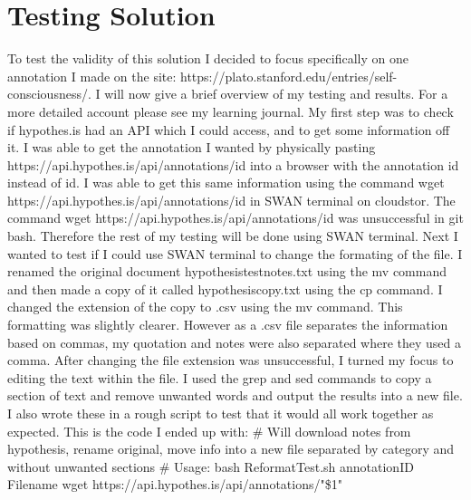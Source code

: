 \documentclass{article}
\begin{document}
\section{Testing Solution}
To test the validity of this solution I decided to focus specifically on one annotation I made on the site: https://plato.stanford.edu/entries/self-consciousness/. I will now give a brief overview of my testing and results. For a more detailed account please see my learning journal. 
\newline
\newline
My first step was to check if hypothes.is had an API which I could access, and to get some information off it. I was able to get the annotation I wanted by physically pasting https://api.hypothes.is/api/annotations/{id} into a browser with the annotation id instead of {id}. I was able to get this same information using the command wget https://api.hypothes.is/api/annotations/{id} in SWAN terminal on cloudstor. The command wget https://api.hypothes.is/api/annotations/{id} was unsuccessful in git bash. Therefore the rest of my testing will be done using SWAN terminal. 
\newline
\newline
Next I wanted to test if I could use SWAN terminal to change the formating of the file. I renamed the original document hypothesistestnotes.txt using the mv command and then made a copy of it called hypothesiscopy.txt using the cp command. I changed the extension of the copy to .csv using the mv command. This formatting was slightly clearer. However as a .csv file separates the information based on commas, my quotation and notes were also separated where they used a comma. 
\newline
\newline
After changing the file extension was unsuccessful, I turned my focus to editing the text within the file. I used the grep and sed commands to copy a section of text and remove unwanted words and output the results into a new file. I also wrote these in a rough script to test that it would all work together as expected. This is the code I ended up with:
\newline
\newline
\# Will download notes from hypothesis, rename original, move info into a new file separated by category and without unwanted sections
\newline
\# Usage: bash ReformatTest.sh annotationID Filename
\newline
wget https://api.hypothes.is/api/annotations/"\$1"
\end{document}
